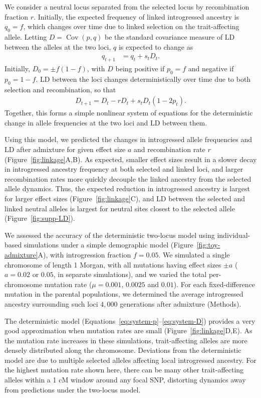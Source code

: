 \documentclass[10pt,letterpaper]{article}
\DeclareMathOperator{\Cov}{Cov}
\begin{document}
We consider a neutral locus separated from the selected locus by recombination
fraction $r$. Initially, the expected frequency of linked introgressed ancestry
is \(q_0=f\), which changes over time due to linked selection on the
trait-affecting allele. Letting \(D=\Cov(p,q)\) be the standard covariance
measure of LD between the alleles at the two loci, $q$ is expected to change as
\begin{align}\label{eq:system-q}
    q_{t+1} & = q_t + s_t D_t.
\end{align}
Initially, \(D_0=\pm f(1-f)\), with \(D\) being positive if \(p_0=f\) and
negative if \(p_0=1-f\). LD between the loci changes deterministically over
time due to both selection and recombination, so that
\begin{align}\label{eq:system-D}
    D_{t+1} = D_t - r D_t + s_t D_t (1-2p_t).
\end{align}
Together, this forms a simple nonlinear system of equations for the
deterministic change in allele frequencies at the two loci and LD between them.

Using this model, we predicted the changes in introgressed allele frequencies
and LD after admixture for given effect size $a$ and recombination rate $r$
(Figure~\ref{fig:linkage}A,B). As expected, smaller effect sizes result in a
slower decay in introgressed ancestry frequency at both selected and linked
loci, and larger recombination rates more quickly decouple the linked ancestry
from the selected allele dynamics. Thus, the expected reduction in introgressed
ancestry is largest for larger effect sizes (Figure~\ref{fig:linkage}C), and LD
between the selected and linked neutral alleles is largest for neutral sites
closest to the selected allele (Figure~\ref{fig:supp-LD}).

We assessed the accuracy of the deterministic two-locus model using
individual-based simulations \cite{thornton2019polygenic} under a simple
demographic model (Figure~\ref{fig:toy-admixture}A), with introgression
fraction \(f=0.05\). We simulated a single chromosome of length 1 Morgan, with
all mutations having effect sizes \(\pm a\) (\(a=0.02\) or \(0.05\), in
separate simulations), and we varied the total per-chromosome mutation rate
(\(\mu=0.001\), \(0.0025\) and \(0.01\)). For each fixed-difference mutation in
the parental populations, we determined the average introgressed ancestry
surrounding such loci $4{,}000$ generations after admixture (Methods).

The deterministic model (Equations~\ref{eq:system-p}--\ref{eq:system-D})
provides a very good approximation when mutation rates are small
(Figure~\ref{fig:linkage}D,E). As the mutation rate increases in these
simulations, trait-affecting alleles are more densely distributed along the
chromosome. Deviations from the deterministic model are due to multiple
selected alleles affecting local introgressed ancestry. For the highest
mutation rate shown here, there can be many other trait-affecting alleles
within a 1 cM window around any focal SNP, distorting dynamics away from
predictions under the two-locus model.
\end{document}
